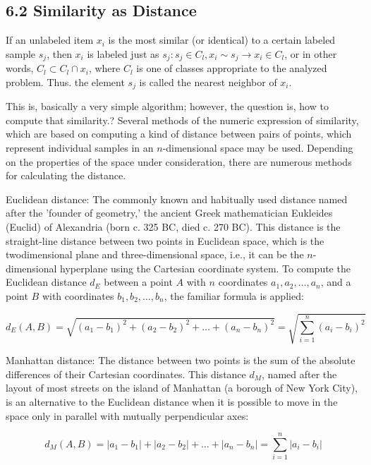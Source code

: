 \documentclass[10pt]{book}
\begin{document}
\subsection*{6.2 Similarity as Distance}
If an unlabeled item $x_{i}$ is the most similar (or identical) to a certain labeled sample $s_{j}$, then $x_{i}$ is labeled just as $s_{j}: s_{j} \in C_{l}, x_{i} \sim s_{j} \rightarrow x_{i} \in C_{l}$, or in other words, $C_{l} \subset C_{l} \cap x_{i}$, where $C_{l}$ is one of classes appropriate to the analyzed problem. Thus. the element $s_{j}$ is called the nearest neighbor of $x_{i}$.

This is, basically a very simple algorithm; however, the question is, how to compute that similarity.? Several methods of the numeric expression of similarity, which are based on computing a kind of distance between pairs of points, which represent individual samples in an $n$-dimensional space may be used. Depending on the properties of the space under consideration, there are numerous methods for calculating the distance.

Euclidean distance: The commonly known and habitually used distance named after the 'founder of geometry,' the ancient Greek mathematician Eukleides (Euclid) of Alexandria (born c. 325 BC, died c. 270 BC). This distance is the straight-line distance between two points in Euclidean space, which is the twodimensional plane and three-dimensional space, i.e., it can be the $n$-dimensional hyperplane using the Cartesian coordinate system. To compute the Euclidean distance $d_{E}$ between a point $A$ with $n$ coordinates $a_{1}, a_{2}, \ldots, a_{n}$, and a point $B$ with coordinates $b_{1}, b_{2}, \ldots, b_{n}$, the familiar formula is applied:


\begin{equation*}
d_{E}(A, B)=\sqrt{\left(a_{1}-b_{1}\right)^{2}+\left(a_{2}-b_{2}\right)^{2}+\ldots+\left(a_{n}-b_{n}\right)^{2}}=\sqrt{\sum_{i=1}^{n}\left(a_{i}-b_{i}\right)^{2}} \tag{6.1}
\end{equation*}


Manhattan distance: The distance between two points is the sum of the absolute differences of their Cartesian coordinates. This distance $d_{M}$, named after the layout of most streets on the island of Manhattan (a borough of New York City), is an alternative to the Euclidean distance when it is possible to move in the space only in parallel with mutually perpendicular axes:


\begin{equation*}
d_{M}(A, B)=\left|a_{1}-b_{1}\right|+\left|a_{2}-b_{2}\right|+\ldots+\left|a_{n}-b_{n}\right|=\sum_{i=1}^{n}\left|a_{i}-b_{i}\right| \tag{6.2}
\end{equation*}
\end{document}
